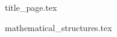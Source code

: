 \documentclass{article}
\begin{document}
  \onehalfspacing
  \setlength{\parskip}{1.5em} 


  {title_page.tex}


  \tableofcontents

  \newpage


  {mathematical_structures.tex}
\end{document}
